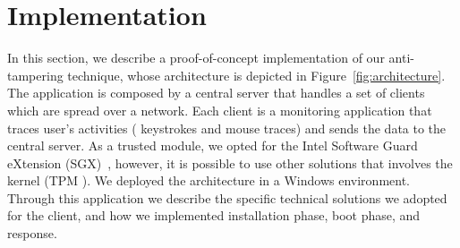 \section{Implementation}
\label{sec:implementation_packing}
In this section, we describe a proof-of-concept implementation of our 
anti-tampering
technique, whose architecture is depicted in Figure~\ref{fig:architecture}.
The application is composed by a central server that handles a set of clients 
which are spread over a network.
Each client is a monitoring application that traces user's activities (\ie 
keystrokes and mouse traces) and sends the
data to the central server.
As a trusted module, we opted for the Intel Software Guard eXtension 
(SGX)~\citep{rozas2013intel}, however, it is possible to use other solutions 
that involves the kernel (\eg TPM \cite{tpm-isoosi}).
We deployed the architecture in a Windows environment.
Through this application we describe the specific technical solutions we 
adopted for the client, and how we implemented installation phase, boot phase, 
and response. 
